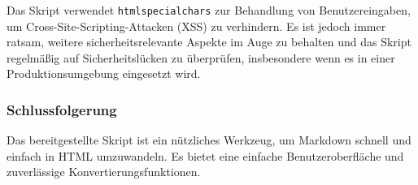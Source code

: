 \documentclass[12pt,a4paper]{scrartcl}
\begin{document}
Das Skript verwendet {\lstinline!htmlspecialchars!} zur
Behandlung von Benutzereingaben, um Cross-Site-Scripting-Attacken (XSS)
zu verhindern. Es ist jedoch immer ratsam, weitere sicherheitsrelevante
Aspekte im Auge zu behalten und das Skript regelmäßig auf
Sicherheitslücken zu überprüfen, insbesondere wenn es in einer
Produktionsumgebung eingesetzt wird.

\hypertarget{schlussfolgerung}{%
\subsubsection{Schlussfolgerung}\label{schlussfolgerung}}

Das bereitgestellte Skript ist ein nützliches Werkzeug, um Markdown
schnell und einfach in HTML umzuwandeln. Es bietet eine einfache
Benutzeroberfläche und zuverlässige
Konvertierungsfunktionen. %
\end{document}
